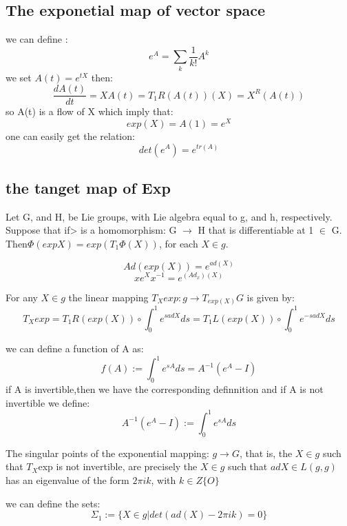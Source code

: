\subsection{The exponetial map of vector space}
we can define :
\[e^A=\sum_k\frac{1}{k!}A^k\]
we set $A(t)=e^{tX}$ then:
\[\frac{dA(t)}{dt}=XA(t)=T_1R(A(t))(X)=X^R(A(t))\]
so A(t) is a flow of X which imply that:
\[exp(X)=A(1)=e^X\]
one can easily get the relation:
\[det(e^A)=e^{tr(A)}\]
\subsection{the tanget map of Exp}
\begin{lemma}
Let G, and H, be Lie groups, with Lie algebra equal to g, and h, respectively. Suppose that if> is a homomorphism: G $\rightarrow$ H that is differentiable at 1 $\in$ G. Then$\Phi(expX) = exp(T_1\Phi(X))$, for each $X\in g$.
\end{lemma}
\begin{theorem}
\[Ad(exp(X))=e^{ad(X)}\]
\[xe^Xx^{-1}=e^{(Ad_x)(X)}\]
\end{theorem}

\begin{theorem}
For any $X\in g$  the linear mapping $T_Xexp:g\rightarrow T_{exp(X)}G$ is given by:
\[T_Xexp=T_1R(exp(X))\circ \int_0^1e^{sadX}ds=T_1L(exp(X))\circ\int_0^1e^{-s adX}ds\]
\end{theorem}
we can define a function of A as:
\[f(A):=\int_0^1e^{sA}ds=A^{-1}(e^A-I)\]
if A is invertible,then we have the corresponding definnition and if A is not invertible we define:
\[A^{-1}(e^A-I):=\int_0^1e^{sA}ds\]
\begin{lemma}
The singular points of the exponential mapping: $g \rightarrow G$, that is, the $X \in g$ such that $T_X$exp is not invertible, are precisely the $X \in g$ such that $ad X \in L(g, g)$ has an eigenvalue of the form $2\pi ik$, with $k \in Z \{O\}$
\end{lemma}
we can define the sets:
\[\Sigma_1:=\{X\in g| det(ad(X)-2\pi ik)=0\}\]
